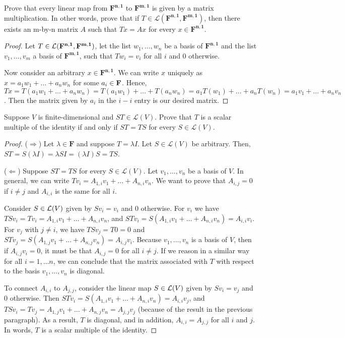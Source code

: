 \begin{exercise}{15}
  Prove that every linear map from $\mathbf{F^{n,1}}$ to $\mathbf{F^{m,1}}$ is given by a matrix multiplication. In other words, prove that if $T\in\mathcal{L}(\mathbf{F^{n,1}}, \mathbf{F^{m,1}})$, then there exists an m-by-n matrix $A$ such that $Tx=Ax$ for every $x\in\mathbf{F^{n,1}}$.
\end{exercise}
\begin{proof}
 Let $T\in\mathcal{L}(\mathbf{F^{n,1}}, \mathbf{F^{m,1}})$, let the list $w_{1},\dots,w_{n}$ be a basis of $\mathbf{F^{n, 1}}$ and the list $v_{1},\dots,v_{m}$ a basis of  $\mathbf{F^{m,1}}$, such that $Tw_{i}=v_{i}$ for all $i$ and 0 otherwise.
 
 Now consider an arbitrary $x\in \mathbf{F^{n,1}}$. We can write $x$ uniquely as $x= a_{1}w_{1}+\dots+a_{n}w_{n}$ for some $a_{i}\in\mathbf{F}$. Hence, $Tx= T(a_{1}w_{1}+\dots+a_{n}w_{n})= T(a_{1}w_{1})+\dots+T(a_{n}w_{n})= a_{1}T(w_{1})+\dots+a_{n}T(w_{n})= a_{1}v_{1}+\dots+a_{n}v_{n}$. Then the matrix given by $a_{i}$ in the $i-i$ entry is our desired matrix.
\end{proof}


\begin{exercise}{16}
  Suppose $V$ is finite-dimensional and $ST\in\mathcal{L}(V)$. Prove that $T$ is a scalar multiple of the identity if and only if $ST=TS$ for every $S\in\mathcal{L}(V)$.
\end{exercise}
\begin{proof}
 ($\Rightarrow$) Let $\lambda\in\mathbf{F}$ and suppose $T=\lambda I$. Let $S\in\mathcal{L}(V)$ be arbitrary. Then, $ST=S(\lambda I)=\lambda SI=(\lambda I)S=TS$.
 
 ($\Leftarrow$) Suppose $ST=TS$ for every $S\in\mathcal{L}(V)$. Let $v_{1},\dots,v_{n}$ be a basis of $V$. In general, we can write $Tv_{i}=A_{1,i}v_{1}+\dots+A_{n,i}v_{n}$. We want to prove that $A_{i,j}=0$ if $i\neq j$ and $A_{i,i}$ is the same for all $i$. 

 Consider $S\in\mathcal{L}(V)$ given by $Sv_{i}=v_{i}$ and 0 otherwise. For $v_{i}$ we have $TSv_{i}=Tv_{i}= A_{1,i}v_{1}+\dots+A_{n,i}v_{n}$, and $STv_{i}= S(A_{1,i}v_{1}+\dots+A_{n,i}v_{n})= A_{i,i}v_{i}$. For $v_{j}$ with $j\neq i$, we have $TSv_{j}= T0= 0$ and $STv_{j}= S(A_{1,j}v_{1}+\dots+A_{n,j}v_{n})= A_{i,j}v_{i}$. Because $v_{1},\dots, v_{n}$ is a basis of $V$, then if $A_{i,j}v_{i}=0$, it must be that $A_{i,j}=0$ for all $i\neq j$. If we reason in a similar way for all $i=1,\dots n$, we can conclude that the matrix associated with $T$ with respect to the basis $v_{1},\dots,v_{n}$ is diagonal.

 To connect $A_{i,i}$ to $A_{j,j}$, consider the linear map $S\in\mathcal{L}(V)$ given by $Sv_{i}=v_{j}$ and 0 otherwise. Then $STv_{i}= S(A_{1,i}v_{1}+\dots+A_{n,i}v_{n})= A_{i,i}v_{j}$, and $TSv_{i}= Tv_{j}= A_{1,j}v_{1}+\dots+A_{n,j}v_{n}= A_{j,j}v_{j}$ (because of the result in the previous paragraph).
 As a result, $T$ is diagonal, and in addition, $A_{i,i}=A_{j,j}$ for all $i$ and $j$. In words, $T$ is a scalar multiple of the identity.
\end{proof}


